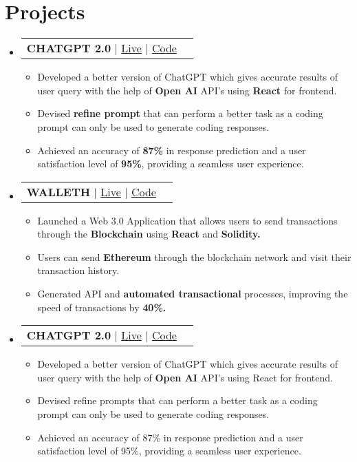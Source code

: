 \documentclass[letterpaper,11pt]{article}
\makeatletter
\newcommand{\resumeItem}[1]{
  \item\small{
    {#1 \vspace{-2pt}}
  }
}
\newcommand{\resumeProjectHeading}[2]{
    \item
    \begin{tabular*}{1.001\textwidth}{l@{\extracolsep{\fill}}r}
      \small#1 & \textbf{\small #2} \\
    \end{tabular*}\vspace{-7pt}
}
\newcommand{\resumeSubHeadingListStart}{\begin{itemize}[leftmargin=0.0in, label={}]}
\newcommand{\resumeSubHeadingListEnd}{\end{itemize}}
\newcommand{\resumeItemListStart}{\justify \begin{itemize} \vspace{-4pt}}
\newcommand{\resumeItemListEnd}{\end{itemize}\vspace{-1pt}}
\makeatother
\begin{document}
\section{Projects}
    \vspace{-2pt}
    \resumeSubHeadingListStart
        \resumeProjectHeading
            {\textbf{CHATGPT 2.0} $|$ \href{https://chat-gpt-enhanced.web.app/}{Live} $|$ \href{https://github.com/tarunbisht-24/chatgpt-enhanced}{Code}}{}
            \resumeItemListStart
                \resumeItem{Developed a better version of ChatGPT which gives accurate results of user query with the help of \textbf{Open AI} API’s using \textbf{React} for frontend.}
                \resumeItem{Devised \textbf{refine prompt} that can perform a better task as a coding prompt can only be used to generate coding responses.}
                \resumeItem{Achieved an accuracy of \textbf{87\%} in response prediction and a user satisfaction level of \textbf{95\%}, providing a seamless user experience.}
            \resumeItemListEnd
        \resumeProjectHeading
            {\textbf{WALLETH} $|$ \href{https://kryptether.netlify.app/}{Live} $|$ \href{https://github.com/tarunbisht-24/walleth}{Code}}{}
            \resumeItemListStart
                \resumeItem{Launched a Web 3.0 Application that allows users to send transactions through the \textbf{Blockchain} using \textbf{React} and \textbf{Solidity.}}
                \resumeItem{Users can send \textbf{Ethereum} through the blockchain network and visit their transaction history.}
                \resumeItem{Generated API and \textbf{automated transactional} processes, improving the speed of transactions by \textbf{40\%.}}
              \resumeItemListEnd
        \resumeProjectHeading
            {\textbf{CHATGPT 2.0} $|$ \href{https://chat-gpt-enhanced.web.app/}{Live} $|$ \href{https://github.com/tarunbisht-24/chatgpt-enhanced}{Code}}{}
            \resumeItemListStart
                \resumeItem{Developed a better version of ChatGPT which gives accurate results of user query with the help of \textbf{Open AI}
API’s using React for frontend.}
                \resumeItem{Devised refine prompts that can perform a better task as a coding prompt can only be used to generate coding
responses.}
                \resumeItem{Achieved an accuracy of 87\% in response prediction and a user satisfaction level of 95\%, providing a seamless
user experience.}
               \resumeItemListEnd
    \resumeSubHeadingListEnd

\end{document}
